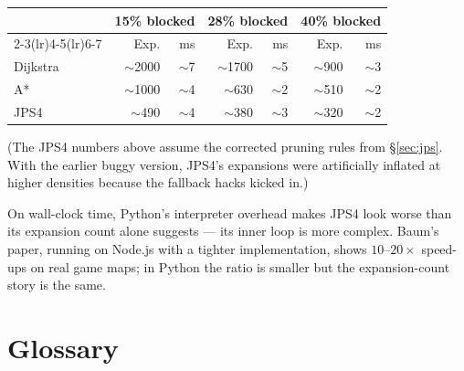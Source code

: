 \documentclass[11pt,a4paper]{article}
\begin{document}
\begin{center}
\renewcommand{\arraystretch}{1.25}
\begin{tabular}{@{}lrrrrrr@{}}
\toprule
& \multicolumn{2}{c}{\textbf{15\% blocked}} & \multicolumn{2}{c}{\textbf{28\% blocked}} & \multicolumn{2}{c}{\textbf{40\% blocked}} \\
\cmidrule(lr){2-3}\cmidrule(lr){4-5}\cmidrule(lr){6-7}
& Exp. & ms & Exp. & ms & Exp. & ms \\
\midrule
Dijkstra & $\sim$2000 & $\sim$7 & $\sim$1700 & $\sim$5 & $\sim$900 & $\sim$3 \\
A*       & $\sim$1000 & $\sim$4 & $\sim$630  & $\sim$2 & $\sim$510 & $\sim$2 \\
JPS4     & $\sim$490  & $\sim$4 & $\sim$380  & $\sim$3 & $\sim$320 & $\sim$2 \\
\bottomrule
\end{tabular}
\end{center}

\noindent (The JPS4 numbers above assume the corrected pruning rules from \S\ref{sec:jps}. With the earlier buggy version, JPS4's expansions were artificially inflated at higher densities because the fallback hacks kicked in.)

On wall-clock time, Python's interpreter overhead makes JPS4 look worse than its expansion count alone suggests --- its inner loop is more complex. Baum's paper, running on Node.js with a tighter implementation, shows $10$--$20\times$ speed-ups on real game maps; in Python the ratio is smaller but the expansion-count story is the same.

\clearpage
\section{Glossary}
\end{document}
